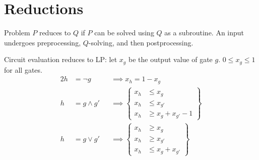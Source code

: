 \section{Reductions}
Problem \(P\) reduces to \(Q\) if \(P\) can be solved using \(Q\) as a subroutine. An input undergoes preprocessing, \(Q\)-solving, and then postprocessing.

Circuit evaluation reduces to LP:
let \(x_g\) be the output value of gate \(g\). \(0\leq x_g \leq 1\) for all gates.
\begin{alignat}{2}
	h &= \lnot g &&\implies x_h = 1 - x_g \\
	h &= g \land g' &&\implies \left\{\begin{aligned}
		x_h &\leq x_g \\
		x_h &\leq  x_{g'} \\
		x_h &\geq x_g + x_{g'} - 1
	\end{aligned}\right\}\\
	h &= g \lor g' &&\implies \left\{\begin{aligned}
	x_h &\geq x_g \\
	x_h &\geq  x_{g'} \\
	x_h &\leq x_g + x_{g'}
	\end{aligned}\right\}
\end{alignat}